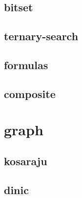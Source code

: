 \vspace{-2pt}
\subsection{bitset}
\vspace{-5pt}
\raggedbottom
\hrulefill

\vspace{-2pt}
\subsection{ternary-search}
\vspace{-5pt}
\raggedbottom
\hrulefill

\vspace{-2pt}
\subsection{formulas}
\vspace{-5pt}
\raggedbottom
\hrulefill

\vspace{-2pt}
\subsection{composite}
\vspace{-5pt}
\raggedbottom
\hrulefill


\section{graph}
\vspace{-2pt}
\subsection{kosaraju}
\vspace{-5pt}
\raggedbottom
\hrulefill

\vspace{-2pt}
\subsection{dinic}
\vspace{-5pt}
\raggedbottom
\hrulefill


